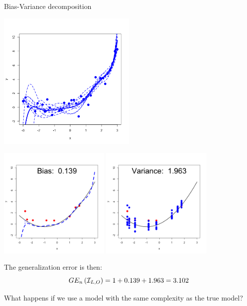 \documentclass[11pt,compress,t,notes=noshow, xcolor=table]{beamer}
\begin{document}
\begin{vbframe} {Bias-Variance decomposition}
\begin{center}
  \includegraphics[width = 0.5\textwidth]{figure/bias_variance_decomposition-complex_model.png}
\end{center}


\framebreak

\begin{center}
  \includegraphics[width = 0.4\textwidth]{figure/bias_variance_decomposition-complex_model_bias.png}
  \includegraphics[width = 0.4\textwidth]{figure/bias_variance_decomposition-complex_model_variance.png}
\end{center}


The generalization error is then: 
$$GE_n\left(\mathcal{I}_{L, O}\right) = 1 + 0.139 + 1.963 = 3.102 $$


\framebreak

What happens if we use a model with the same complexity as the true model? 


\end{vbframe}
\end{document}
